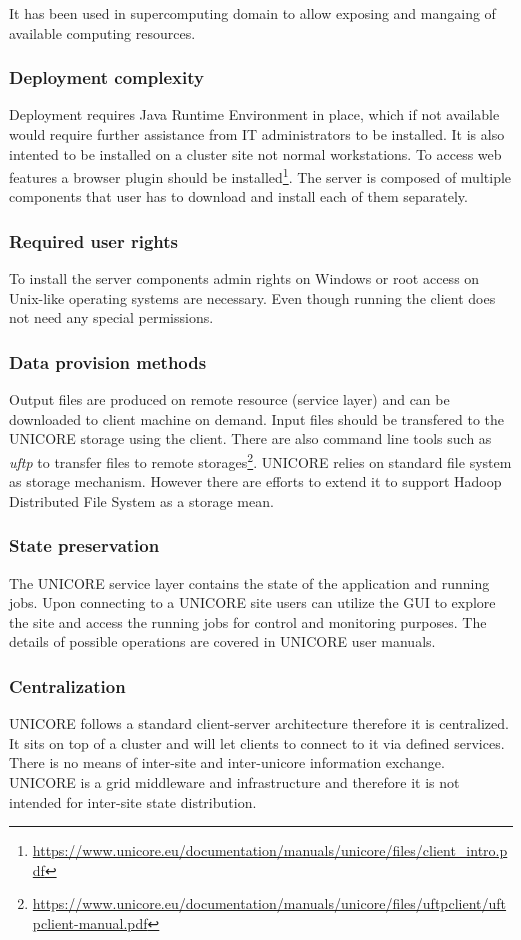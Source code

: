 It has been used in supercomputing domain to allow exposing and mangaing of available 
computing resources.\cite{unicore_arch}

\subsubsection {Deployment complexity}
Deployment requires Java Runtime Environment in place, which if not available would require 
further assistance from IT administrators to be installed. It is also intented to be installed
on a cluster site not normal workstations. To access web features a browser plugin should be
installed\footnote{
\url{https://www.unicore.eu/documentation/manuals/unicore/files/client_intro.pdf}}.
The server is composed of multiple components that user 
has to download and install each of them separately.
\subsubsection {Required user rights}
To install the server components admin rights on Windows or root access on Unix-like operating
systems are necessary. Even though running the client does not need any special permissions.
\subsubsection{Data provision methods}
Output files are produced on remote resource (service layer) and can be downloaded to client
machine on demand. Input files should be transfered to the UNICORE storage using the client.
There are also command line tools such as \textit{uftp} to transfer files to remote 
storages\footnote{
\url{https://www.unicore.eu/documentation/manuals/unicore/files/uftpclient/uftpclient-manual.pdf}}.
UNICORE relies on standard file system as storage mechanism. However there are efforts to 
extend it to support Hadoop Distributed File System as a storage mean.\cite{wasim2009}
\subsubsection {State preservation}
The UNICORE service layer contains the state of the application and running jobs. 
Upon connecting to a UNICORE site users can utilize the GUI to explore 
the site and access the running jobs for control and monitoring purposes.
The details of possible operations are covered in UNICORE user manuals.

\subsubsection {Centralization}
UNICORE follows a standard client-server architecture therefore it is centralized. It sits on 
top of a cluster and will let clients to connect to it via defined services. There is no means
of inter-site and inter-unicore information exchange. UNICORE is a grid middleware and
infrastructure and therefore it is not intended for inter-site state distribution.
